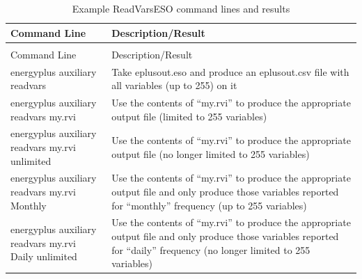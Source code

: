 \begin{longtable}[c]{p{1.5in}p{4.5in}}
\caption{Example ReadVarsESO command lines and results \label{table:example-readvarseso-command-lines-and-results}} \tabularnewline
\toprule
Command Line & Description/Result \tabularnewline
\midrule
\endfirsthead

\caption[]{Example ReadVarsESO command lines and results} \tabularnewline
\toprule
Command Line & Description/Result \tabularnewline
\midrule
\endhead

energyplus auxiliary readvars & Take eplusout.eso and produce an eplusout.csv file with all variables (up to 255) on it \tabularnewline
energyplus auxiliary readvars my.rvi & Use the contents of “my.rvi” to produce the appropriate output file (limited to 255 variables) \tabularnewline
energyplus auxiliary readvars my.rvi unlimited & Use the contents of “my.rvi” to produce the appropriate output file (no longer limited to 255 variables) \tabularnewline
energyplus auxiliary readvars my.rvi Monthly & Use the contents of “my.rvi” to produce the appropriate output file and only produce those variables reported for “monthly” frequency (up to 255 variables) \tabularnewline
energyplus auxiliary readvars my.rvi Daily unlimited & Use the contents of “my.rvi” to produce the appropriate output file and only produce those variables reported for “daily” frequency (no longer limited to 255 variables) \tabularnewline
\bottomrule
\end{longtable}

